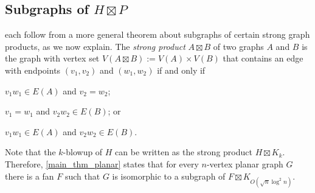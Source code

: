 \documentclass{patmorin}
\newcommand{\defin}[1]{\emph{\textcolor{brightmaroon}{#1}}}
\begin{document}

\subsection{\boldmath Subgraphs of \texorpdfstring{$H\boxtimes P$}{H *P}}

 each follow from a more general theorem about subgraphs of certain strong graph products, as we now explain.  The \defin{strong product} $A\boxtimes B$ of two graphs $A$ and $B$ is the graph with vertex set $V(A\boxtimes B):=V(A)\times V(B)$ that contains an edge with endpoints $(v_1,v_2)$  and $(w_1,w_2)$ if and only if
\begin{compactenum}
    \item $v_1w_1\in E(A)$ and $v_2=w_2$;
    \item $v_1=w_1$ and $v_2w_2\in E(B)$; or
    \item $v_1w_1\in E(A)$ and $v_2w_2\in E(B)$.
\end{compactenum}
Note that the $k$-blowup of $H$ can be written as the strong product $H\boxtimes K_k$.  Therefore, \cref{main_thm_planar} states that for every $n$-vertex planar graph $G$ there is a fan $F$ such that $G$ is isomorphic to a subgraph of $F\boxtimes K_{O(\sqrt{n}\log^2 n)}$.
\end{document}
